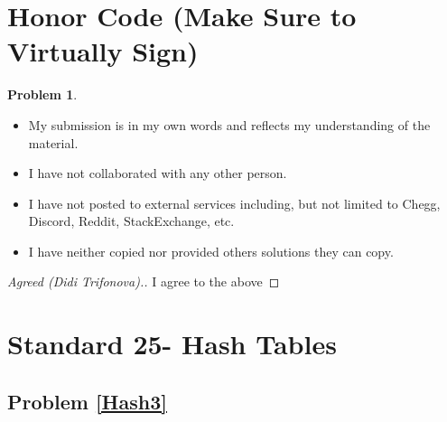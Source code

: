 \documentclass[11pt]{article}
\theoremstyle{definition}
\theoremstyle{definition}
\newtheorem{required}{Problem}
\theoremstyle{definition}
\begin{document}
\section{Honor Code (Make Sure to Virtually Sign)} \label{HonorCode}

\begin{required}
\noindent 
\begin{itemize}
\item My submission is in my own words and reflects my understanding of the material.
\item I have not collaborated with any other person.
\item I have not posted to external services including, but not limited to Chegg, Discord, Reddit, StackExchange, etc.
\item I have neither copied nor provided others solutions they can copy.
\end{itemize}

\end{required}

\begin{proof}[Agreed (Didi Trifonova).]
I agree to the above
\end{proof}


\newpage
\section{Standard 25- Hash Tables}
\subsection{Problem \ref{Hash3}}
\end{document}
